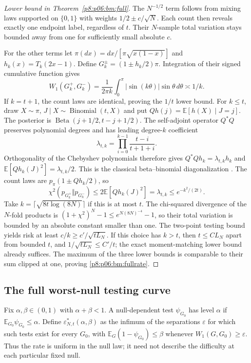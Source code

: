 \documentclass[11pt,a4paper]{article}
\theoremstyle{definition}
\theoremstyle{remark}
\numberwithin{equation}{section}
\begin{document}
\begin{proof}[Lower bound in Theorem~\ref{p8:p06:bm:full}]
The $N^{-1/2}$ term follows from mixing laws supported on $\{0,1\}$ with
weights $1/2\pm c/\sqrt N$. Each count then reveals exactly one endpoint
label, regardless of $t$. Their $N$-sample total variation stays bounded
away from one for sufficiently small absolute $c$.

For the other terms let $\pi(dx)=dx/[\pi\sqrt{x(1-x)}]$ and
$h_k(x)=T_k(2x-1)$. Define
$G_k^\pm=(1\pm h_k/2)\pi$. Integration of their signed cumulative
function gives
\[
 W_1(G_k^+,G_k^-)
  =\frac1{2\pi k}\int_0^\pi|\sin(k\theta)|\sin\theta\,d\theta
  \asymp1/k.
\]
If $k=t+1$, the count laws are identical, proving the $1/t$ lower bound.
For $k\le t$, draw $X\sim\pi$, $J\mid X\sim\operatorname{Binomial}(t,X)$
and put $Qh(j)=\mathbb E[h(X)\mid J=j]$. The posterior is
$\operatorname{Beta}(j+1/2,t-j+1/2)$. The self-adjoint operator $Q^*Q$
preserves polynomial degrees and has leading degree-$k$ coefficient
\[
 \lambda_{t,k}=\prod_{i=0}^{k-1}\frac{t-i}{t+1+i}.
\]
Orthogonality of the Chebyshev polynomials therefore gives
$Q^*Qh_k=\lambda_{t,k}h_k$ and
$\mathbb E[Qh_k(J)^2]=\lambda_{t,k}/2$.
This is the classical beta--binomial diagonalization
\cite[Section~4.1]{p8:BT_DKS2008}.
The count laws are $p_\pi(1\pm Qh_k/2)$, so
\[
 \chi^2(p_{G_k^+}\Vert p_{G_k^-})
 \le2\mathbb E[Qh_k(J)^2]=\lambda_{t,k}
 \le e^{-k^2/(2t)}.
\]
Take $k=\lceil\sqrt{8t\log(8N)}\rceil$ if this is at most $t$.
The chi-squared divergence of the $N$-fold products is
$(1+\chi^2)^N-1\le e^{N(8N)^{-4}}-1$, so their total variation is
bounded by an absolute constant smaller than one. The two-point testing
bound yields risk at least $c/k\ge c'/\sqrt{tL_N}$.
If this choice has $k>t$, then $t\le C L_N$ apart from bounded $t$,
and $1/\sqrt{tL_N}\le C'/t$; the exact moment-matching lower bound
already suffices. The maximum of the three lower bounds is comparable
to their sum clipped at one, proving \eqref{p8:p06:bm:fullrate}.
\end{proof}


\subsection{The full worst-null testing curve}

Fix $\alpha,\beta\in(0,1)$ with $\alpha+\beta<1$. A null-dependent test
$\psi_{G_0}$ has level $\alpha$ if
$\mathbb E_{G_0}\psi_{G_0}\le\alpha$. Define
$\varepsilon^*_{N,t}(\alpha,\beta)$ as the infimum of the separations
$\varepsilon$ for which such tests exist for every $G_0$, with
$\mathbb E_G(1-\psi_{G_0})\le\beta$ whenever
$W_1(G,G_0)\ge\varepsilon$. Thus the rate is uniform in the null law;
it need not describe the difficulty at each particular fixed null.
\end{document}
